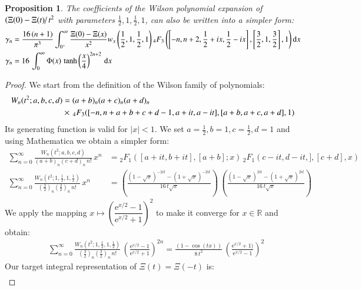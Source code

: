 \documentclass[a4paper,11pt,twoside]{amsart}
\newtheorem{proposition}[theorem]{Proposition}
\newcommand{\verifiedeq}{=}
\newcommand{\defeq}{=}
\newcommand{\verifiedeq}{\stackrel{\checkmark}{=}}
\newcommand{\defeq}{\stackrel{\scriptscriptstyle \textnormal{def}}{=}}
\begin{document}
\begin{proposition}
The coefficients of the Wilson polynomial expansion of $\left(\Xi(0) -\Xi(t)\right/t^2$ with parameters $\frac12,1,\frac12,1$, can also be written into a simpler form: \notag \\  
\begin{align}
\gamma_n &\verifiedeq \frac{16\,(n+1)}{\pi^3}\int_{0^+}^\infty   \frac{\Xi(0) -\Xi(x)}{x^2}w_x\left(\frac12,1,\frac12,1\right){}_4F_3\left(\left[-n, n+2,\frac12+ix, \frac12- ix\right],\left[\frac32, 1, \frac32\right], 1\right) \mathrm{d}x \notag \\
\gamma_n &\verifiedeq 16\,\int_{0}^\infty \Phi(x)\,\tanh\left(\frac{x}{4}\right)^{2n+2}\, \mathrm{d}x \notag
\end{align}
\end{proposition}
\begin{proof}
We start from the definition of the Wilson family of polynomials:
\begin{align}
 W_n(t^2;a,b,c,d) &\defeq (a+b)_n(a+c)_n(a+d)_n\, \\
  &\times\, {}_4F_3([-n, n+ a+b+c+d-1,a+it, a- it], [a+b, a+c, a+d], 1) \notag
\end{align}
Its generating function is valid for $|x| < 1$. We set $a=\frac12,b=1,c=\frac12,d=1$ and using Mathematica we obtain a simpler form: 
\begin{align}
 \sum_{n=0}^\infty \frac{W_n(t^2;a,b,c,d)}{(a+b)_n(c+d)_n\,n!}\, x^n &\verifiedeq {}_2F_1\left([a+it, b+it],[a+b] ;x\right)\,{}_2F_1\left(c-it, d-it,],[c+d],x\right) \\
 \sum_{n=0}^\infty \frac{W_n\left(t^2;1,\frac12,1,\frac12\right)}{\left(\frac32\right)_n\left(\frac32\right)_n\,n!}\,x^n&\verifiedeq \left(\frac{(1-\sqrt{x})^{-2it}-(1+\sqrt{x})^{-2it}}{16\,t\sqrt{x}}\right)\,\left(\frac{(1-\sqrt{x})^{2it}-(1+\sqrt{x})^{2it}}{16\,t\sqrt{x}}\right)
\end{align} 
We apply the mapping $x \mapsto \left(\dfrac{\textrm{e}^{x/2}-1}{\textrm{e}^{x/2}+1}\right)^2$ to make it converge for $x \in \mathbb{R}$ and obtain: 
\begin{align}
 &\sum_{n=0}^\infty \frac{W_n\left(t^2;1,\frac12,1,\frac12\right)}{\left(\frac32\right)_n\left(\frac32\right)_n\,n!}\, \left(\frac{\textrm{e}^{x/2}-1}{\textrm{e}^{x/2}+1}\right)^{2n} \verifiedeq \frac{\left(1-\cos(tx)\right)}{8\,t^2}\,\left(\frac{\textrm{e}^{x/2}+1)}{\textrm{e}^{x/2}-1}\right)^2
\end{align}
Our target integral representation of $\Xi(t) = \Xi(-t)$ is:
\begin{align}

\end{align}
\end{proof}
\end{document}
